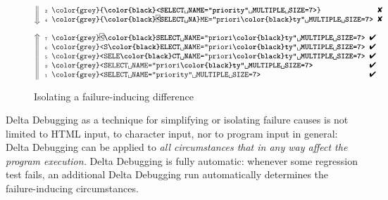 \documentclass{acm_proc_article-sp}
\newcommand{\HTML}       {{\small HTML}\xspace}
\newcommand{\PASS}{\text{\ding{52}}\xspace}
\newcommand{\FAIL}{\text{\ding{56}}\xspace}
\newcommand{\dd}{\textit{dd}\xspace}
\newcommand{\ddmin}{\textit{ddmin}\xspace}
\newcommand{\s}{\char32}
\theoremstyle{plain}
\begin{document}
\begin{figure}[t]
\renewcommand{\a}[1]{%
{\textbf{\color{black}#1}}}
\newcommand{\n}[1]{{\tiny #1}}
\renewcommand{\t}[1]{\texttt{\color{grey}#1}}
\newcommand{\f}[1]{\frame{\rule[-0.1em]{0pt}{0.8em}#1}}
\scriptsize

$$
\begin{array}{@{}l@{}}
\left\Downarrow
\begin{tabular}{r@{\;\;}l@{\;\;}l}
\n{2} & \t{\a{<SELECT{\s}NAME="priority"{\s}MULTIPLE{\s}SIZE=7>}}   & \FAIL \\
\n{4} & \t{\a{\f{<}SELECT{\s}NA}ME="priori\a{ty"{\s}MULTIPLE{\s}SIZE=7>}} & \FAIL \\
\end{tabular}
\right.
\\
\strut
\\
\left\Uparrow
\begin{tabular}{r@{\;\;}l@{\;\;}l}
\n{7} & \t{\f{<}\a{SELECT{\s}NA}ME="priori\a{ty"{\s}MULTIPLE{\s}SIZE=7>}} & \PASS \\
\n{6} & \t{<S\a{ELECT{\s}NA}ME="priori\a{ty"{\s}MULTIPLE{\s}SIZE=7>}} & \PASS \\
\n{5} & \t{<SELE\a{CT{\s}NA}ME="priori\a{ty"{\s}MULTIPLE{\s}SIZE=7>}} & \PASS \\
\n{3} & \t{<SELECT{\s}NAME="priori\a{ty"{\s}MULTIPLE{\s}SIZE=7>}}   & \PASS \\
\n{1} & \t{<SELECT{\s}NAME="priority"{\s}MULTIPLE{\s}SIZE=7>}       & \PASS \\
\end{tabular}
\right.
\end{array}
$$
\caption{Isolating a failure-inducing difference}
\label{fig:isolate-html-diff}
\end{figure}



Delta Debugging as a technique for simplifying or isolating failure
causes is not limited to \HTML input, to character input, nor to
program input in general: Delta Debugging can be applied to \emph{all
  circumstances that in any way affect the program execution.}  Delta
Debugging is fully automatic: whenever some regression test fails, an
additional Delta Debugging run automatically determines the
failure-inducing circumstances.
\end{document}
